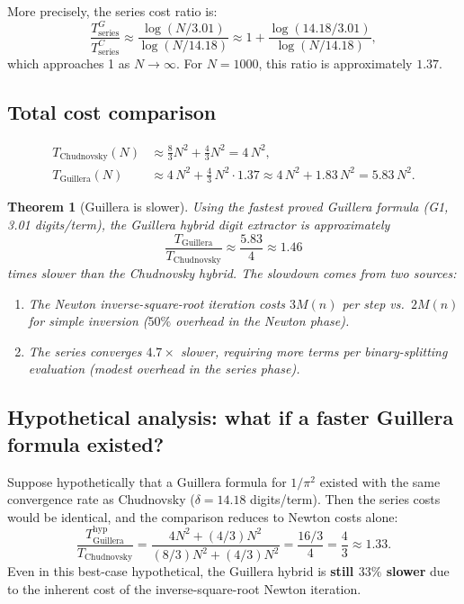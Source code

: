 \documentclass[11pt]{article}
\newtheorem{theorem}{Theorem}[section]
\begin{document}
More precisely, the series cost ratio is:
\[
\frac{T_{\text{series}}^G}{T_{\text{series}}^C} \approx \frac{\log(N/3.01)}{\log(N/14.18)} \approx 1 + \frac{\log(14.18/3.01)}{\log(N/14.18)},
\]
which approaches 1 as $N \to \infty$. For $N = 1000$, this ratio is approximately $1.37$.

\subsection{Total cost comparison}

\begin{align}
T_{\text{Chudnovsky}}(N) &\approx \frac{8}{3}N^2 + \frac{4}{3}N^2 = 4\,N^2, \label{eq:TC}\\
T_{\text{Guillera}}(N) &\approx 4\,N^2 + \frac{4}{3}\,N^2 \cdot 1.37 \approx 4\,N^2 + 1.83\,N^2 = 5.83\,N^2. \label{eq:TG}
\end{align}

\begin{theorem}[Guillera is slower]\label{thm:slower}
Using the fastest proved Guillera formula (G1, 3.01 digits/term), the Guillera hybrid digit extractor is approximately
\[
\frac{T_{\text{Guillera}}}{T_{\text{Chudnovsky}}} \approx \frac{5.83}{4} \approx 1.46
\]
times slower than the Chudnovsky hybrid. The slowdown comes from two sources:
\begin{enumerate}
\item The Newton inverse-square-root iteration costs $3M(n)$ per step vs.\ $2M(n)$ for simple inversion ($50\%$ overhead in the Newton phase).
\item The series converges $4.7\times$ slower, requiring more terms per binary-splitting evaluation (modest overhead in the series phase).
\end{enumerate}
\end{theorem}

\subsection{Hypothetical analysis: what if a faster Guillera formula existed?}

Suppose hypothetically that a Guillera formula for $1/\pi^2$ existed with the same convergence rate as Chudnovsky ($\delta = 14.18$ digits/term). Then the series costs would be identical, and the comparison reduces to Newton costs alone:
\[
\frac{T_{\text{Guillera}}^{\text{hyp}}}{T_{\text{Chudnovsky}}} = \frac{4N^2 + (4/3)N^2}{(8/3)N^2 + (4/3)N^2} = \frac{16/3}{4} = \frac{4}{3} \approx 1.33.
\]
Even in this best-case hypothetical, the Guillera hybrid is \textbf{still $33\%$ slower} due to the inherent cost of the inverse-square-root Newton iteration.
\end{document}
